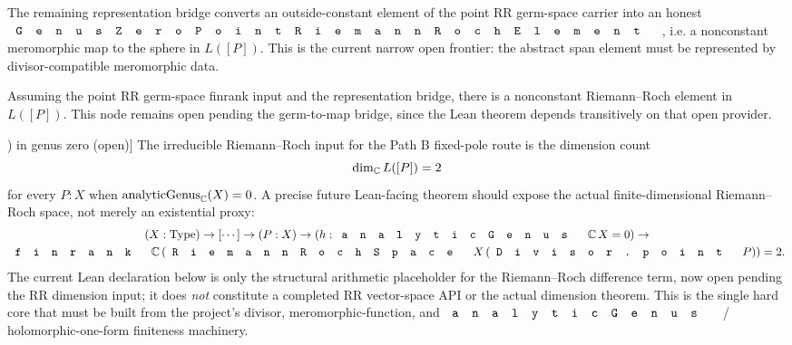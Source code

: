 \begin{lemma}
\label{lem:rr-germ-to-map-bridge}
The remaining representation bridge converts an outside-constant element of the
point RR germ-space carrier into an honest
\(\code{GenusZeroPointRiemannRochElement}\), i.e. a nonconstant meromorphic
map to the sphere in \(L([P])\). This is the current narrow open frontier:
the abstract span element must be represented by divisor-compatible
meromorphic data.
\end{lemma}

\begin{lemma}
\label{lem:rr-element-of-germ-space-dimension-input}
Assuming the point RR germ-space finrank input and the representation bridge,
there is a nonconstant Riemann--Roch element in \(L([P])\). This node remains
open pending the germ-to-map bridge, since the Lean theorem depends
transitively on that open provider.
\end{lemma}

\begin{lemma}[Hard core: dimension of \(L([P])\) in genus zero (open)]
\label{lem:rr-dim-L-point-eq-two-core}
The irreducible Riemann--Roch input for the Path B fixed-pole route is the
dimension count
\[
  \dim_{\mathbb{C}} L([P]) = 2
\]
for every \(P:X\) when \(\mathrm{analyticGenus}_{\mathbb{C}}(X)=0\). A precise future
Lean-facing theorem should expose the actual finite-dimensional
Riemann--Roch space, not merely an existential proxy:
\[
\begin{gathered}
  (X : \mathrm{Type}) \to [\cdots] \to
  (P : X) \to (h : \code{analyticGenus}\,\C\,X = 0) \to\\
  \code{finrank}\,\C\,(\code{RiemannRochSpace}\,X\,(\code{Divisor.point}\,P)) = 2.
\end{gathered}
\]
The current Lean declaration below is only the structural arithmetic placeholder
for the Riemann--Roch difference term, now open pending the RR dimension input;
it does \emph{not} constitute a completed RR vector-space API or the actual
dimension theorem. This is the single hard core that must be built from the
project's divisor, meromorphic-function, and \(\code{analyticGenus}\) /
holomorphic-one-form finiteness machinery.
\end{lemma}


